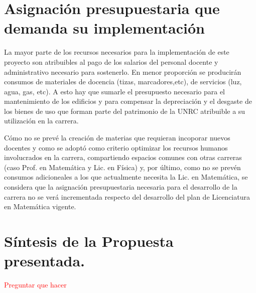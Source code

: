 \documentclass[a4paper, 12pt]{article}
\begin{document}
\section{Asignación presupuestaria que demanda su
implementación}

La mayor parte de los recursos necesarios para la implementación de este proyecto son atribuibles al pago de los salarios del personal docente y administrativo necesario para sostenerlo. En menor proporción se producirán  consumos de materiales de docencia (tizas, marcadores,etc), de servicios (luz, agua, gas, etc). A esto hay que sumarle el presupuesto necesario para el mantenimiento   de los edificios y para compensar la depreciación y el desgaste de los bienes de uso que forman parte del patrimonio de la UNRC atribuible a su utilización en  la carrera. 

Cómo no se prevé la creación de materias que requieran incoporar nuevos docentes y como se adoptó como criterio optimizar los recursos humanos involucrados en la carrera, compartiendo espacios comunes con otras carreras (caso Prof. en Matemática y Lic. en Física)  y, por último, como no se prevén consumos adicioneales a los que actualmente necesita la Lic. en Matemática, se considera que la asignación presupuestaria necesaria para el desarrollo de la
carrera no se verá incrementada respecto del desarrollo del plan de Licenciatura en Matemática vigente.


\section{Síntesis de la Propuesta presentada. }

\textcolor{red}{Preguntar que hacer}





\end{document}
